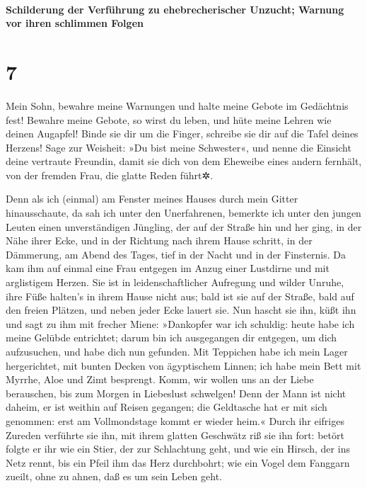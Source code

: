 \hypertarget{schilderung-der-verfuxfchrung-zu-ehebrecherischer-unzucht-warnung-vor-ihren-schlimmen-folgen}{%
\paragraph{Schilderung der Verführung zu ehebrecherischer Unzucht;
Warnung vor ihren schlimmen
Folgen}\label{schilderung-der-verfuxfchrung-zu-ehebrecherischer-unzucht-warnung-vor-ihren-schlimmen-folgen}}

\hypertarget{section-6}{%
\section{7}\label{section-6}}

Mein Sohn, bewahre meine Warnungen und halte meine Gebote
im Gedächtnis fest! Bewahre meine Gebote, so wirst du
leben, und hüte meine Lehren wie deinen Augapfel! Binde
sie dir um die Finger, schreibe sie dir auf die Tafel deines Herzens!
Sage zur Weisheit: »Du bist meine Schwester«, und nenne
die Einsicht deine vertraute Freundin, damit sie dich von
dem Eheweibe eines andern fernhält, von der fremden Frau, die glatte
Reden führt✲.

Denn als ich (einmal) am Fenster meines Hauses durch mein
Gitter hinausschaute, da sah ich unter den Unerfahrenen,
bemerkte ich unter den jungen Leuten einen unverständigen Jüngling,
der auf der Straße hin und her ging, in der Nähe ihrer
Ecke, und in der Richtung nach ihrem Hause schritt, in der
Dämmerung, am Abend des Tages, tief in der Nacht und in der Finsternis.
Da kam ihm auf einmal eine Frau entgegen im Anzug einer
Lustdirne und mit arglistigem Herzen. Sie ist in
leidenschaftlicher Aufregung und wilder Unruhe, ihre Füße halten's in
ihrem Hause nicht aus; bald ist sie auf der Straße, bald
auf den freien Plätzen, und neben jeder Ecke lauert sie.
Nun hascht sie ihn, küßt ihn und sagt zu ihm mit frecher
Miene: »Dankopfer war ich schuldig: heute habe ich meine
Gelübde entrichtet; darum bin ich ausgegangen dir
entgegen, um dich aufzusuchen, und habe dich nun gefunden.
Mit Teppichen habe ich mein Lager hergerichtet, mit
bunten Decken von ägyptischem Linnen; ich habe mein Bett
mit Myrrhe, Aloe und Zimt besprengt. Komm, wir wollen uns
an der Liebe berauschen, bis zum Morgen in Liebeslust schwelgen!
Denn der Mann ist nicht daheim, er ist weithin auf Reisen
gegangen; die Geldtasche hat er mit sich genommen: erst
am Vollmondstage kommt er wieder heim.« Durch ihr
eifriges Zureden verführte sie ihn, mit ihrem glatten Geschwätz riß sie
ihn fort: betört folgte er ihr wie ein Stier, der zur
Schlachtung geht, und wie ein Hirsch, der ins Netz rennt,
bis ein Pfeil ihm das Herz durchbohrt; wie ein Vogel dem
Fanggarn zueilt, ohne zu ahnen, daß es um sein Leben geht.

